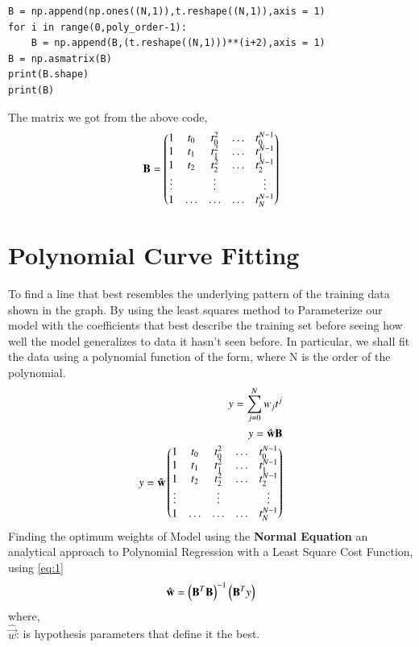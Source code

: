 \documentclass[journal,12pt,twocolumn]{IEEEtran}
\begin{document}
\begin{lstlisting}
B = np.append(np.ones((N,1)),t.reshape((N,1)),axis = 1)
for i in range(0,poly_order-1):
	B = np.append(B,(t.reshape((N,1)))**(i+2),axis = 1)
B = np.asmatrix(B)
print(B.shape)
print(B)
\end{lstlisting}
The matrix we got from the above code,
\begin{align}
\mathbf{B}= \begin{pmatrix} 1 & t_{0} & t_{0}^2 & \ldots & t_{0}^{N-1} \\
		1 & t_{1} & t_{1}^2 & \ldots & t_{1}^{N-1} \\
		1 & t_{2} & t_{2}^2 & \ldots & t_{2}^{N-1} \\
		\vdots & & \vdots &  & \vdots  \\
		    1 & \ldots & \ldots & \ldots & t_{N}^{N-1} \end{pmatrix}\label{eq:1}
\end{align}
%
\section{Polynomial Curve Fitting}
To find a line that best resembles the underlying pattern of the training data shown in the graph. By using the least squares method to Parameterize our model with the coefficients that best describe the training set before seeing how well the model generalizes to data it hasn’t seen before.
In particular, we shall fit the data using a
polynomial function of the form, where N is the order of the polynomial. 
\begin{align}
y = \sum_{j=0}^{N} w_jt^{j}\\
y = \hat{\mathbf{w}}\mathbf{B}\\
y= \hat{\mathbf{w}}\begin{pmatrix} 1 & t_{0} & t_{0}^2 & \ldots & t_{0}^{N-1} \\
		1 & t_{1} & t_{1}^2 & \ldots & t_{1}^{N-1} \\
		1 & t_{2} & t_{2}^2 & \ldots & t_{2}^{N-1} \\
		\vdots & & \vdots &  & \vdots  \\
		    1 & \ldots & \ldots & \ldots & t_{N}^{N-1} \end{pmatrix}\label{eq:2}
\end{align}
Finding the optimum weights of Model using the \textbf{Normal Equation} an analytical approach to Polynomial Regression with a Least Square Cost Function, using \eqref{eq:1}
\begin{align}
    \hat{\mathbf{w}} = \left(\mathbf{B}^T\mathbf{B}\right)^{-1}\left(\mathbf{B}^Ty\right)
\end{align}
where,
\\
$\hat{\vec{w}}$: is hypothesis parameters that define it the best.
\end{document}
